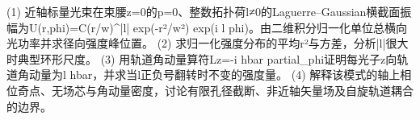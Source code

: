 (1) 近轴标量光束在束腰z=0的p=0、整数拓扑荷l≠0的Laguerre–Gaussian横截面振幅为U(r,phi)=C(r/w)^|l| exp(-r²/w²) exp(i l phi)。由二维积分归一化单位总横向光功率并求径向强度峰位置。
(2) 求归一化强度分布的平均r²与方差，分析|l|很大时典型环形尺度。
(3) 用轨道角动量算符Lz=-i hbar partial_phi证明每光子z向轨道角动量为l hbar，并求当l正负号翻转时不变的强度量。
(4) 解释该模式的轴上相位奇点、无场芯与角动量密度，讨论有限孔径截断、非近轴矢量场及自旋轨道耦合的边界。
